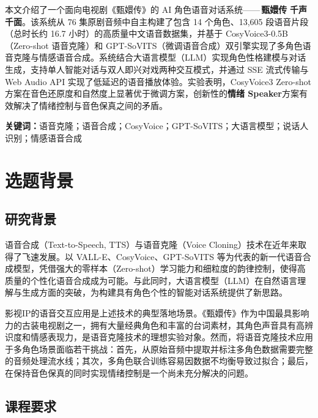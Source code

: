\documentclass[12pt,a4paper]{article}
\begin{document}
本文介绍了一个面向电视剧《甄嬛传》的 AI 角色语音对话系统------\,\textbf{甄嬛传\,\textperiodcentered\,千声千面}。该系统从 76 集原剧音频中自主构建了包含 14 个角色、13,605 段语音片段（总时长约 16.7 小时）的高质量中文语音数据集，并基于 CosyVoice3-0.5B（Zero-shot 语音克隆）和 GPT-SoVITS（微调语音合成）双引擎实现了多角色语音克隆与情感语音合成。系统结合大语言模型（LLM）实现角色性格建模与对话生成，支持单人智能对话与双人即兴对戏两种交互模式，并通过 SSE 流式传输与 Web Audio API 实现了低延迟的语音播放体验。实验表明，CosyVoice3 Zero-shot 方案在音色还原度和自然度上显著优于微调方案，创新性的\textbf{情绪 Speaker}方案有效解决了情绪控制与音色保真之间的矛盾。

\vspace{0.8cm}
\noindent\textbf{关键词：}语音克隆；语音合成；CosyVoice；GPT-SoVITS；大语言模型；说话人识别；情感语音合成

\newpage
\tableofcontents
\newpage
{}
\setcounter{page}{1}

\section{选题背景}
\label{sec:background}

\subsection{研究背景}

语音合成（Text-to-Speech, TTS）与语音克隆（Voice Cloning）技术在近年来取得了飞速发展。以 VALL-E、CosyVoice、GPT-SoVITS 等为代表的新一代语音合成模型，凭借强大的零样本（Zero-shot）学习能力和细粒度的韵律控制，使得高质量的个性化语音合成成为可能。与此同时，大语言模型（LLM）在自然语言理解与生成方面的突破，为构建具有角色个性的智能对话系统提供了新思路。

影视IP的语音交互应用是上述技术的典型落地场景。《甄嬛传》作为中国最具影响力的古装电视剧之一，拥有大量经典角色和丰富的台词素材，其角色声音具有高辨识度和情感表现力，是语音克隆技术的理想实验对象。然而，将语音克隆技术应用于多角色场景面临若干挑战：首先，从原始音频中提取并标注多角色数据需要完整的音频处理流水线；其次，多角色联合训练容易因数据不均衡导致过拟合；最后，在保持音色保真的同时实现情绪控制是一个尚未充分解决的问题。

\subsection{课程要求}
\end{document}
